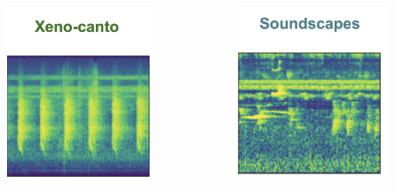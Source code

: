 \begin{frame}{}
    \begin{columns}
        \begin{column}{0.5\textwidth}
            \centering
            \includegraphics[height=0.7\textheight,width=0.7\textwidth,keepaspectratio]{images/xeno.png}
        \end{column}
        \begin{column}{0.5\textwidth}
            \centering
            \includegraphics[height=0.7\textheight,width=0.7\textwidth,keepaspectratio]{images/soundscape.png}
        \end{column}
    \end{columns}
\end{frame}



